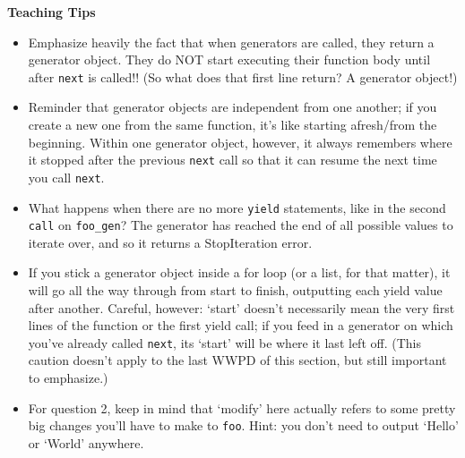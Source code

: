 \begin{blocksection}
\begin{guide}
\textbf{Teaching Tips}
\begin{itemize}
\item Emphasize heavily the fact that when generators are called, they return a generator object. They do NOT start executing their function body until after \texttt{next} is called!! (So what does that first line return? A generator object!)
\item Reminder that generator objects are independent from one another; if you create a new one from the same function, it's like starting afresh/from the beginning. Within one generator object, however, it always remembers where it stopped after the previous \texttt{next} call so that it can resume the next time you call \texttt{next}.
\item What happens when there are no more \texttt{yield} statements, like in the second \texttt{call} on \texttt{foo\_gen}? The generator has reached the end of all possible values to iterate over, and so it returns a StopIteration error.
\item If you stick a generator object inside a for loop (or a list, for that matter), it will go all the way through from start to finish, outputting each yield value after another. Careful, however: `start' doesn't necessarily mean the very first lines of the function or the first yield call; if you feed in a generator on which you've already called \texttt{next}, its `start' will be where it last left off. (This caution doesn't apply to the last WWPD of this section, but still important to emphasize.)
\item For question 2, keep in mind that `modify' here actually refers to some pretty big changes you'll have to make to \texttt{foo}. Hint: you don't need to output `Hello' or `World' anywhere.
\end{itemize}
\end{guide}
\end{blocksection}
